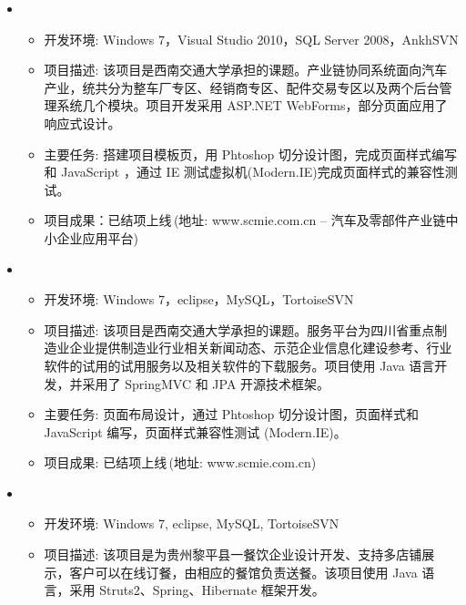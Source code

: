 \documentclass[letterpaper,11pt]{article}
\begin{document}
  \begin{itemize}[leftmargin=*]
    \item
      {\footnotesize
      \begin{itemize}
        \item 开发环境: Windows 7，Visual Studio 2010，SQL Server 2008，AnkhSVN
        \item 项目描述: 该项目是西南交通大学承担的课题。产业链协同系统面向汽车产业，统共分为整车厂专区、经销商专区、配件交易专区以及两个后台管理系统几个模块。项目开发采用 ASP.NET WebForms，部分页面应用了响应式设计。
        \item 主要任务: 搭建项目模板页，用 Phtoshop 切分设计图，完成页面样式编写和 JavaScript ，通过 IE 测试虚拟机(Modern.IE)完成页面样式的兼容性测试。
        \item 项目成果：已结项上线$\,$(地址: www.scmie.com.cn -- 汽车及零部件产业链中小企业应用平台)
      \end{itemize}
      }
    \item
      {\footnotesize
      \begin{itemize}
        \item 开发环境: Windows 7，eclipse，MySQL，TortoiseSVN
        \item 项目描述: 该项目是西南交通大学承担的课题。服务平台为四川省重点制造业企业提供制造业行业相关新闻动态、示范企业信息化建设参考、行业软件的试用的试用服务以及相关软件的下载服务。项目使用 Java 语言开发，并采用了 SpringMVC 和 JPA 开源技术框架。
        \item 主要任务: 页面布局设计，通过 Phtoshop 切分设计图，页面样式和 JavaScript 编写，页面样式兼容性测试 (Modern.IE)。
        \item 项目成果: 已结项上线$\,$(地址: www.scmie.com.cn)
      \end{itemize}
      }
    \item
    {\footnotesize
    \begin{itemize}
      \item 开发环境: Windows 7, eclipse, MySQL, TortoiseSVN
      \item 项目描述: 该项目是为贵州黎平县一餐饮企业设计开发、支持多店铺展示，客户可以在线订餐，由相应的餐馆负责送餐。该项目使用 Java 语言，采用 Struts2、Spring、Hibernate 框架开发。

\end{itemize}}
\end{itemize}
\end{document}

